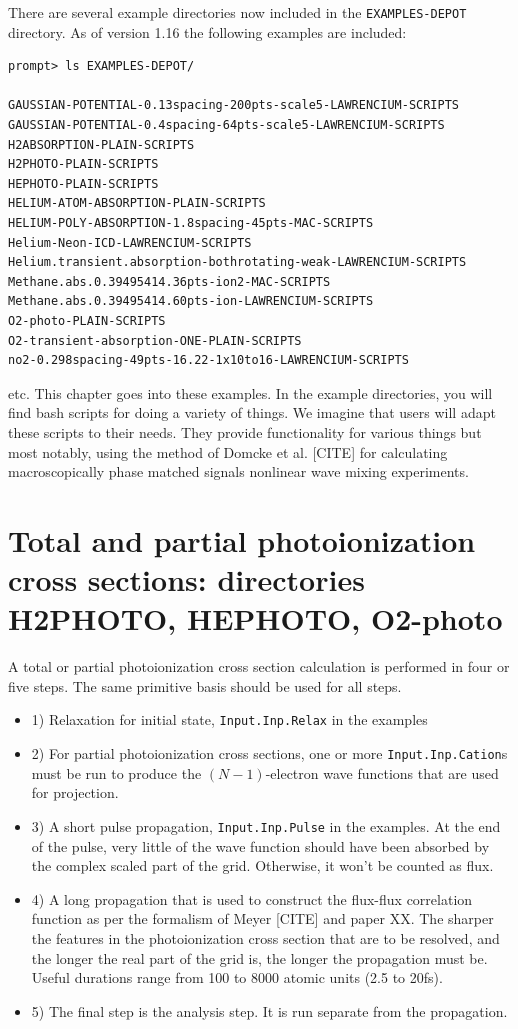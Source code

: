 \documentclass[10pt,leqno, oneside]{book}
\begin{document}
There are several example directories now included in the \verb#EXAMPLES-DEPOT# directory.  As of version 1.16 the following examples
are included:

{\footnotesize
\begin{verbatim}
prompt> ls EXAMPLES-DEPOT/

GAUSSIAN-POTENTIAL-0.13spacing-200pts-scale5-LAWRENCIUM-SCRIPTS
GAUSSIAN-POTENTIAL-0.4spacing-64pts-scale5-LAWRENCIUM-SCRIPTS
H2ABSORPTION-PLAIN-SCRIPTS
H2PHOTO-PLAIN-SCRIPTS
HEPHOTO-PLAIN-SCRIPTS
HELIUM-ATOM-ABSORPTION-PLAIN-SCRIPTS
HELIUM-POLY-ABSORPTION-1.8spacing-45pts-MAC-SCRIPTS
Helium-Neon-ICD-LAWRENCIUM-SCRIPTS
Helium.transient.absorption-bothrotating-weak-LAWRENCIUM-SCRIPTS
Methane.abs.0.39495414.36pts-ion2-MAC-SCRIPTS
Methane.abs.0.39495414.60pts-ion-LAWRENCIUM-SCRIPTS
O2-photo-PLAIN-SCRIPTS
O2-transient-absorption-ONE-PLAIN-SCRIPTS
no2-0.298spacing-49pts-16.22-1x10to16-LAWRENCIUM-SCRIPTS
\end{verbatim}
}

etc.  This chapter goes into these examples.  In the example directories, you will find bash scripts for doing a variety of things.
We imagine that users will adapt these scripts to their needs.  They provide functionality for various things but most notably,
using the method of Domcke et al. [CITE] for calculating macroscopically phase matched signals nonlinear wave mixing experiments.



\section{Total and partial photoionization cross sections: directories H2PHOTO, HEPHOTO, O2-photo }

A total or partial photoionization cross section calculation is performed in four or five steps.  
The same primitive basis should be used for all steps.
%
\begin{itemize}
\item{1) Relaxation for initial state, \verb#Input.Inp.Relax# in the examples}
\item{2) For partial photoionization cross sections, one or more \verb#Input.Inp.Cation#s must be run to produce the $(N-1)$-electron wave functions
that are used for projection.}
\item{3) A short pulse propagation, \verb#Input.Inp.Pulse# in the examples.  At the end of the pulse, very little of the wave function should have 
been absorbed by the complex scaled part of the grid.  Otherwise, it won't be counted as flux.}
\item{4) A long propagation that is used to construct the flux-flux correlation function as per the formalism of Meyer [CITE] and paper XX.  The sharper the features
in the photoionization cross section that are to be resolved, and the longer the real part of the grid is,
the longer the propagation must be.  Useful durations range from 100 to 8000 atomic units (2.5 to 20fs).}
\item{5) The final step is the analysis step.  It is run separate from the propagation. }
\end{itemize}
\end{document}
